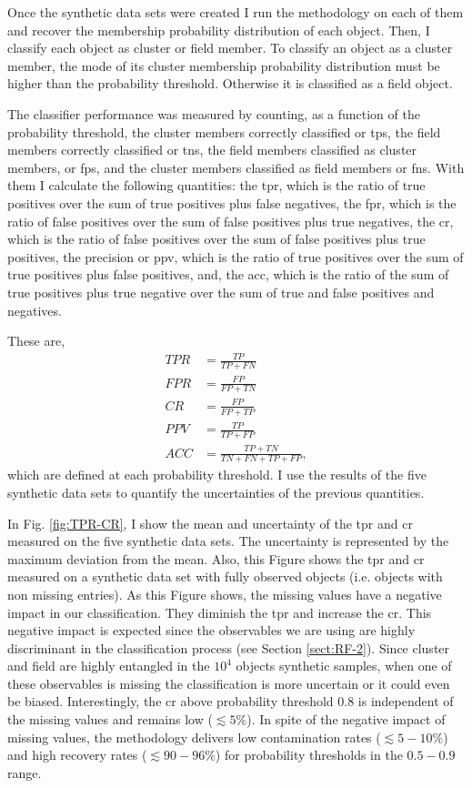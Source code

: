 Once the synthetic data sets were created I run the methodology on each of them and recover the membership probability distribution of each object. Then, I classify each object as cluster or field member. To classify an object as a cluster member, the mode of its cluster membership probability distribution must be higher than the probability threshold. Otherwise it is classified as a field object. 

The classifier performance was measured by counting, as a function of the probability threshold, the cluster members correctly classified or \glspl{tp}, the field members correctly classified or \glspl{tn}, the field members classified as cluster members, or \glspl{fp}, and the cluster members classified as field members or \glspl{fn}. With them I calculate the following quantities: the \gls{tpr}, which is the ratio of true positives over the sum of true positives plus false negatives, the \gls{fpr}, which is the ratio of false positives over the sum of false positives plus true negatives, the \gls{cr}, which is the ratio of false positives over the sum of false positives plus true positives, the precision or \gls{ppv}, which is the ratio of true positives over the sum of true positives plus false positives, and, the \gls{acc}, which is the ratio of the sum of true positives plus true negative over the sum of true and false positives and negatives. 

These are,
\begin{align}
TPR &= \frac{TP}{TP+FN} \nonumber \\
FPR &= \frac{FP}{FP+TN} \nonumber \\
CR   &= \frac{FP}{FP+TP} \nonumber \\
PPV &= \frac{TP}{TP+FP} \nonumber \\
ACC &= \frac{TP+TN}{TN+FN+TP+FP},\nonumber
\end{align}
which are defined at each probability threshold. I use the results of the five synthetic data sets to quantify the uncertainties of the previous quantities. 

In Fig. \ref{fig:TPR-CR}, I show the mean and uncertainty of the \gls{tpr} and \gls{cr} measured on the five synthetic data sets. The uncertainty is represented by the maximum deviation from the mean. Also, this Figure shows the \gls{tpr} and \gls{cr} measured on a synthetic data set with fully observed objects (i.e. objects with non missing entries). As this Figure shows, the missing values have a negative impact in our classification. They diminish the \gls{tpr}  and increase the \gls{cr}. This negative impact is expected since the observables we are using are highly discriminant in the classification process (see Section \ref{sect:RF-2}). Since cluster and field are highly entangled in the $10^4$ objects synthetic samples, when one of these observables is missing the classification is more uncertain or it could even be biased. Interestingly, the \gls{cr} above probability threshold 0.8 is independent of the missing values and remains low ($\lesssim 5\%$). In spite of the negative impact of missing values, the methodology delivers low contamination rates ($\lesssim 5-10\%$) and high recovery rates ($\lesssim 90-96\%$) for probability thresholds in the $0.5-0.9$ range. 


